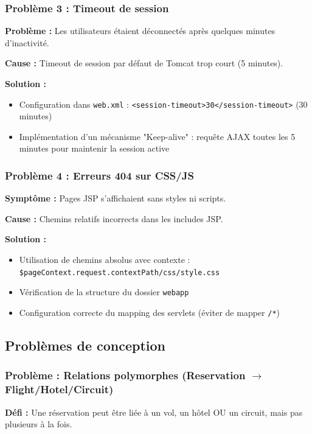 \documentclass[12pt,a4paper]{report}
\begin{document}
\subsubsection{Problème 3 : Timeout de session}

\textbf{Problème :} Les utilisateurs étaient déconnectés après quelques minutes d'inactivité.

\textbf{Cause :} Timeout de session par défaut de Tomcat trop court (5 minutes).

\textbf{Solution :}
\begin{itemize}
    \item Configuration dans \texttt{web.xml} : \texttt{<session-timeout>30</session-timeout>} (30 minutes)
    \item Implémentation d'un mécanisme "Keep-alive" : requête AJAX toutes les 5 minutes pour maintenir la session active
\end{itemize}

\subsubsection{Problème 4 : Erreurs 404 sur CSS/JS}

\textbf{Symptôme :} Pages JSP s'affichaient sans styles ni scripts.

\textbf{Cause :} Chemins relatifs incorrects dans les includes JSP.

\textbf{Solution :}
\begin{itemize}
    \item Utilisation de chemins absolus avec contexte : \texttt{\${pageContext.request.contextPath}/css/style.css}
    \item Vérification de la structure du dossier \texttt{webapp}
    \item Configuration correcte du mapping des servlets (éviter de mapper \texttt{/*})
\end{itemize}

\subsection{Problèmes de conception}

\subsubsection{Problème : Relations polymorphes (Reservation $\rightarrow$ Flight/Hotel/Circuit)}

\textbf{Défi :} Une réservation peut être liée à un vol, un hôtel OU un circuit, mais pas plusieurs à la fois.
\end{document}
